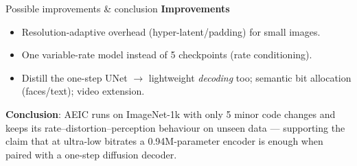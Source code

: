 \documentclass[aspectratio=169]{beamer}
\begin{document}
\begin{frame}{Possible improvements \& conclusion}
  \textbf{Improvements}
  \begin{itemize}
    \item Resolution-adaptive overhead (hyper-latent/padding) for small images.
    \item One variable-rate model instead of 5 checkpoints (rate conditioning).
    \item Distill the one-step UNet $\to$ lightweight \emph{decoding} too; semantic bit allocation
          (faces/text); video extension.
  \end{itemize}
  \medskip
  \textbf{Conclusion}: AEIC runs on ImageNet-1k with only 5 minor code changes and keeps its
  rate--distortion--perception behaviour on unseen data — supporting the claim that at ultra-low
  bitrates a 0.94M-parameter encoder is enough when paired with a one-step diffusion decoder.
\end{frame}
\end{document}
